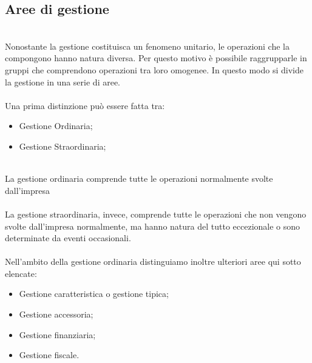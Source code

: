 \documentclass{report}
\begin{document}
\subsection{Aree di gestione} %
\label{sec:Aree di gestione}
\\
Nonostante la gestione costituisca un fenomeno unitario, le operazioni che la compongono hanno natura diversa. Per questo motivo è possibile raggrupparle in gruppi che comprendono operazioni tra loro omogenee. In questo modo si divide la gestione in una serie di aree.
\\
\\
Una prima distinzione può essere fatta tra:
\\
\begin{itemize}
  \item{Gestione Ordinaria;}
  \item{Gestione Straordinaria;}
\end{itemize}
\\
La gestione ordinaria comprende tutte le operazioni normalmente svolte dall'impresa
\\
\\
La gestione straordinaria, invece, comprende tutte le operazioni che non vengono svolte dall'impresa normalmente, ma hanno natura del tutto eccezionale o sono determinate da eventi occasionali.
\\
\\
Nell'ambito della gestione ordinaria distinguiamo inoltre ulteriori aree qui sotto elencate:
\\
\begin{itemize}
  \item{Gestione caratteristica o gestione tipica;}
  \item{Gestione accessoria;}
  \item{Gestione finanziaria;}
  \item{Gestione fiscale.}
\end{itemize}
\\
\\
\\
\end{document}
